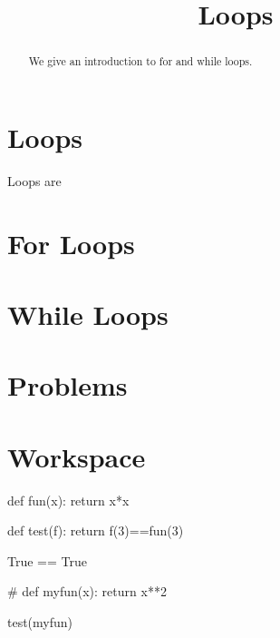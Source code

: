 \documentclass{ximera}
\title{Loops}
\begin{document}
  
\begin{abstract}  
We give an introduction to for and while loops.
\end{abstract}  
\maketitle

\section{Loops}

Loops are 

\section{For Loops}

\section{While Loops}

\section{Problems}

\begin{question}
\end{question}

\begin{question}
\end{question}

\section{Workspace}

\begin{expandable}
\begin{sageOutput}
def fun(x):
        return x*x

def test(f):
        return f(3)==fun(3)


True == True
\end{sageOutput}
\end{expandable}

\begin{sageCell}
#
def myfun(x):
        return x**2

test(myfun)
\end{sageCell}
\end{document}
